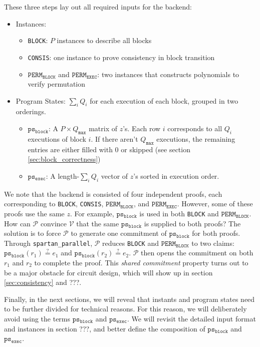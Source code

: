 \documentclass{article}
\newcommand{\red}[1] {\color{red}#1\color{black}}
\newcommand{\code}{\texttt}
\newcommand{\Qmax}{Q_{\mathtt{max}}}
\renewcommand{\P}{\mathcal{P}}
\newcommand{\V}{\mathcal{V}}
\newcommand{\PERMB}{\mathtt{PERM_{BLOCK}}}
\newcommand{\PERME}{\mathtt{PERM_{EXEC}}}
\newcommand{\psb}{\mathtt{ps_{block}}}
\newcommand{\pse}{\mathtt{ps_{exec}}}
\newcommand{\eqq}{\stackrel{?}{=}}
\begin{document}
\noindent These three steps lay out all required inputs for the backend:
\begin{itemize}
    \item Instances:
    \begin{itemize}
        \item \code{BLOCK}: $P$ instances to describe all blocks
        \item \code{CONSIS}: one instance to prove consistency in block transition
        \item $\PERMB$ and $\PERME$: two instances that constructs polynomials to verify permutation
    \end{itemize}
    \item Program States: $\sum_i Q_i$ for each execution of each block, grouped in two orderings.
    \begin{itemize}
        \item $\psb$: A $P\times \Qmax$ matrix of $z$'s. Each row $i$ corresponds to all $Q_i$ executions of block $i$. If there aren't $\Qmax$ executions, the remaining entries are either filled with 0 or skipped (see section \ref{sec:block_correctness})
        \item $\pse$: A length-$\sum_i Q_i$ vector of $z$'s sorted in execution order.
    \end{itemize}
\end{itemize}

We note that the backend is consisted of four independent proofs, each corresponding to \code{BLOCK}, \code{CONSIS}, $\PERMB$, and $\PERME$. However, some of these proofs use the same $z$. For example, $\psb$ is used in both \code{BLOCK} and $\PERMB$. How can $\P$ convince $\V$ that the same $\psb$ is supplied to both proofs? The solution is to force $\P$ to generate one commitment of $\psb$ for both proofs. Through \code{spartan\_parallel}, $\P$ reduces \code{BLOCK} and $\PERMB$ to two claims: $\psb(r_1) \eqq e_1$ and $\psb(r_2) \eqq e_2$. $\P$ then opens the commitment on both $r_1$ and $r_2$ to complete the proof. This \emph{shared commitment} property turns out to be a major obstacle for circuit design, which will show up in section \ref{sec:consistency} and \red{???}.

Finally, in the next sections, we will reveal that instants and program states need to be further divided for technical reasons. For this reason, we will deliberately avoid using the terms $\psb$ and $\pse$. We will revisit the detailed input format and instances in section \red{???}, and better define the composition of $\psb$ and $\pse$.
\end{document}
